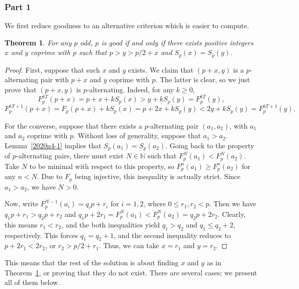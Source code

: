 \documentclass{article}
\newtheorem{theorem}{Theorem}
\newcommand{\N}{\mathbb{N}}
\begin{document}
\subsubsection*{Part 1}

We first reduce goodness to an alternative criterion which is easier to compute.

\begin{theorem}\label{2020n4-2}
For any $p$ odd, $p$ is good if and only if there exists positive integers $x$ and $y$ coprime with $p$ such that $p > y > p/2 + x$ and $S_p(x) = S_p(y)$.
\end{theorem}
\begin{proof}
First, suppose that such $x$ and $y$ exists.
We claim that $(p + x, y)$ is a $p$-alternating pair with $p + x$ and $y$ coprime with $p$.
The latter is clear, so we just prove that $(p + x, y)$ is $p$-alternating.
Indeed, for any $k \geq 0$,
\[ F_p^{kT}(p + x) = p + x + k S_p(x) > y + k S_p(y) = F_p^{kT}(y), \]
\[ F_p^{kT + 1}(p + x) = F_p(p + x) + k S_p(x) = p + 2x + k S_p(y) < 2y + k S_p(y) = F_p^{kT + 1}(y). \]

For the converse, suppose that there exists a $p$-alternating pair $(a_1, a_2)$, with $a_1$ and $a_2$ coprime with $p$.
Without loss of generality, suppose that $a_1 > a_2$.
Lemma~\ref{2020n4-1} implies that $S_p(a_1) = S_p(a_2)$.
Going back to the property of $p$-alternating pairs, there must exist $N \in \N$ such that $F_p^N(a_1) < F_p^N(a_2)$.
Take $N$ to be minimal with respect to this property, so $F_p^n(a_1) \geq F_p^n(a_2)$ for any $n < N$.
Due to $F_p$ being injective, this inequality is actually strict.
Since $a_1 > a_2$, we have $N > 0$.

Now, write $F_p^{N - 1}(a_i) = q_i p + r_i$ for $i = 1, 2$, where $0 \leq r_1, r_2 < p$.
Then we have $q_1 p + r_1 > q_2 p + r_2$ and $q_1 p + 2 r_1 = F_p^N(a_1) < F_p^N(a_2) = q_2 p + 2 r_2$.
Clearly, this means $r_1 < r_2$, and the both inequalities yield $q_1 > q_2$ and $q_1 \leq q_2 + 2$, respectively.
This forces $q_1 = q_2 + 1$, and the second inequality reduces to $p + 2 r_1 < 2 r_2$, or $r_2 > p/2 + r_1$.
Thus, we can take $x = r_1$ and $y = r_2$.
\end{proof}

This means that the rest of the solution is about finding $x$ and $y$ as in Theorem~\ref{2020n4-2}, or proving that they do not exist.
There are several cases; we present all of them below.
\end{document}
